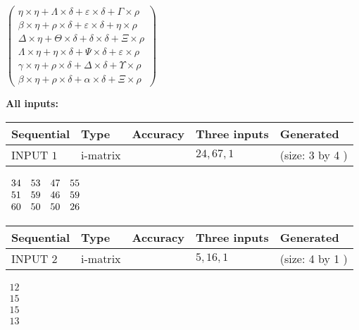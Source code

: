 \documentclass[12pt]{article}
\begin{document}
   
 $   \left( \begin{array}
 {
 c
 }
 \eta \times  \eta   +  \Lambda \times  \delta   +  \varepsilon \times  \delta   +  \Gamma \times  \rho \\ 
 \beta \times  \eta   +  \rho \times  \delta   +  \varepsilon \times  \delta   +  \eta \times  \rho \\ 
 \Delta \times  \eta   +  \Theta \times  \delta   +  \delta \times  \delta   +                     \Xi \times  \rho \\ 
 \Lambda \times  \eta   +  \eta \times  \delta   +  \Psi \times  \delta   +  \varepsilon \times  \rho \\ 
 \gamma \times  \eta   +  \rho \times  \delta   +  \Delta \times  \delta   +  \Upsilon \times  \rho \\ 
 \beta \times  \eta   +  \rho \times  \delta   +  \alpha \times  \delta   +                     \Xi \times  \rho
 \end{array} \right) $ 
   
   
\noindent\vspace{0.1in}\hspace{-0.08in} {\textbf{\Large{All inputs: }}}
   
   
  
  
\noindent\begin{tabular}{|l|l|l|l|l|}
\hline
 Sequential & Type & Accuracy & Three inputs & Generated \\ 
\hline
 
 
  INPUT $  1 $ & i-matrix &  & $
 24
 , 
 67
 , 
 1
 $ & (size:  3  by  4 )
 \\  \hline  
 \end{tabular}
   
   
 $\begin{array}{
 c
 c
 c
 c
 }
 34  & 
 53  & 
 47  & 
 55  \\ 
 51  & 
 59  & 
 46  & 
 59  \\ 
 60  & 
 50  & 
 50  & 
 26
\end{array}  $ 
  
  
\noindent\begin{tabular}{|l|l|l|l|l|}
\hline
 Sequential & Type & Accuracy & Three inputs & Generated \\ 
\hline
 
 
  INPUT $  2 $ & i-matrix &  & $
 5
 , 
 16
 , 
 1
 $ & (size:  4  by  1 )
 \\  \hline  
 \end{tabular}
   
   
 $\begin{array}{
 c
 }
 12  \\ 
 15  \\ 
 15  \\ 
 13
\end{array}  $ 
  
\end{document}
